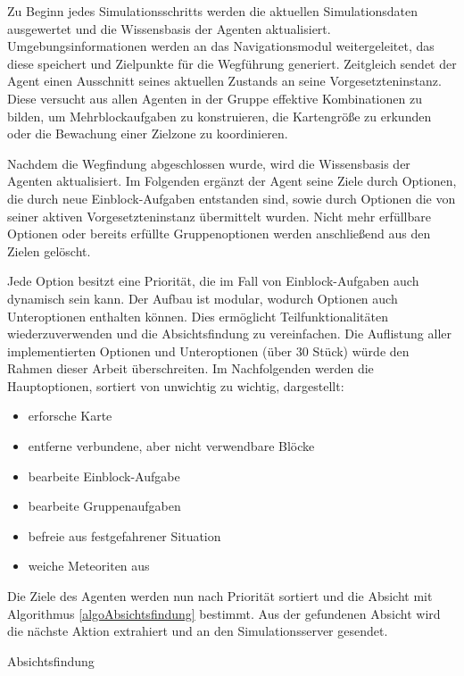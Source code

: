 \documentclass[runningheads]{llncs}
\begin{document}
Zu Beginn jedes Simulationsschritts werden die aktuellen Simulationsdaten ausgewertet und die Wissensbasis der Agenten aktualisiert. Umgebungsinformationen werden an das Navigationsmodul weitergeleitet, das diese speichert und Zielpunkte für die Wegführung generiert. Zeitgleich sendet der Agent einen Ausschnitt seines aktuellen Zustands an seine Vorgesetzteninstanz. Diese versucht aus allen Agenten in der Gruppe effektive Kombinationen zu bilden, um Mehrblockaufgaben zu konstruieren, die Kartengröße zu erkunden oder die Bewachung einer Zielzone zu koordinieren.

Nachdem die Wegfindung abgeschlossen wurde, wird die Wissensbasis der Agenten aktualisiert. Im Folgenden ergänzt der Agent seine Ziele durch Optionen, die durch neue Einblock-Aufgaben entstanden sind, sowie durch Optionen die von seiner aktiven Vorgesetzteninstanz übermittelt wurden. Nicht mehr erfüllbare Optionen oder bereits erfüllte Gruppenoptionen werden anschließend aus den Zielen gelöscht.

Jede Option besitzt eine Priorität, die im Fall von Einblock-Aufgaben auch dynamisch sein kann. Der Aufbau ist modular, wodurch Optionen auch Unteroptionen enthalten können. Dies ermöglicht Teilfunktionalitäten wiederzuverwenden und die Absichtsfindung zu vereinfachen. Die Auflistung aller implementierten Optionen und Unteroptionen (über 30 Stück) würde den Rahmen dieser Arbeit überschreiten. Im Nachfolgenden werden die Hauptoptionen, sortiert von unwichtig zu wichtig, dargestellt:

\begin{itemize}
\item erforsche Karte
\item entferne verbundene, aber nicht verwendbare Blöcke
\item bearbeite Einblock-Aufgabe
\item bearbeite Gruppenaufgaben
\item befreie aus festgefahrener Situation
\item weiche Meteoriten aus
\end{itemize}

Die Ziele des Agenten werden nun nach Priorität sortiert und die Absicht mit Algorithmus \ref{algoAbsichtsfindung} bestimmt. Aus der gefundenen Absicht wird die nächste Aktion extrahiert und an den Simulationsserver gesendet.

\begin{algorithm}
\caption{Absichtsfindung}\label{alg:two}
\label{algoAbsichtsfindung}
\end{algorithm}
\end{document}
